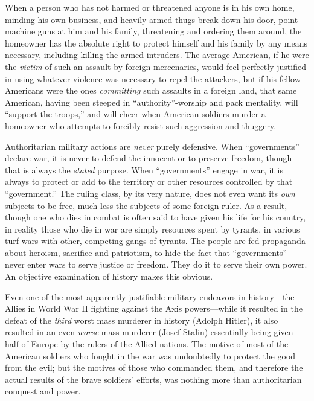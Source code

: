 \documentclass{book}
\begin{document}
When a person who has not harmed or threatened anyone is in his own home, minding his own business, and heavily armed thugs break down his door, point machine guns at him and his family, threatening and ordering them around, the homeowner has the absolute right to protect himself and his family by any means necessary, including killing the armed intruders. The average American, if he were the \emph{victim} of such an assault by foreign mercenaries, would feel perfectly justified in using whatever violence was necessary to repel the attackers, but if his fellow Americans were the ones \emph{committing} such assaults in a foreign land, that same American, having been steeped in \enquote{authority}-worship and pack mentality, will \enquote{support the troops,} and will cheer when American soldiers murder a homeowner who attempts to forcibly resist such aggression and thuggery.

Authoritarian military actions are \emph{never} purely defensive. When \enquote{governments} declare war, it is never to defend the innocent or to preserve freedom, though that is always the \emph{stated} purpose. When \enquote{governments} engage in war, it is always to protect or add to the territory or other resources controlled by that \enquote{government.} The ruling class, by its very nature, does not even want its \emph{own} subjects to be free, much less the subjects of some foreign ruler. As a result, though one who dies in combat is often said to have given his life for his country, in reality those who die in war are simply resources spent by tyrants, in various turf wars with other, competing gangs of tyrants. The people are fed propaganda about heroism, sacrifice and patriotism, to hide the fact that \enquote{governments} never enter wars to serve justice or freedom. They do it to serve their own power. An objective examination of history makes this obvious.

Even one of the most apparently justifiable military endeavors in history---the Allies in World War II fighting against the Axis powers---while it resulted in the defeat of the \emph{third} worst mass murderer in history (Adolph Hitler), it also resulted in an even \emph{worse} mass murderer (Josef Stalin) essentially being given half of Europe by the rulers of the Allied nations. The motive of most of the American soldiers who fought in the war was undoubtedly to protect the good from the evil; but the motives of those who commanded them, and therefore the actual results of the brave soldiers' efforts, was nothing more than authoritarian conquest and power.
\end{document}
